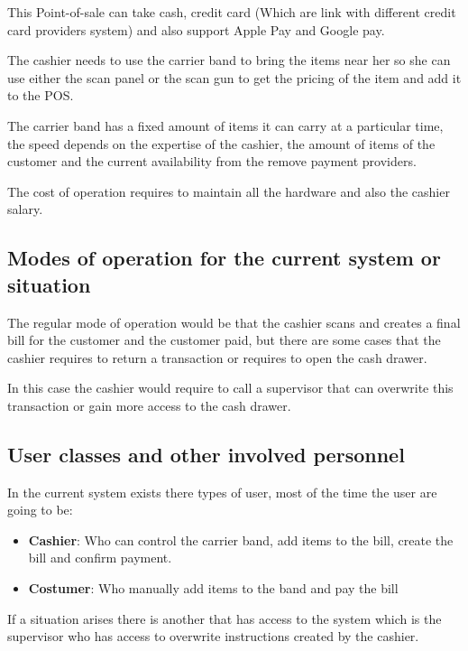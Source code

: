 \documentclass[12pt]{article}
\begin{document}
This Point-of-sale can take cash, credit card (Which are link with different 
credit card providers system) and also support Apple Pay and Google pay.\newline

The cashier needs to use the carrier band to bring the items near her so she 
can use either the scan panel or the scan gun to get the pricing of the item 
and add it to the POS.\newline

The carrier band has a fixed amount of items it can carry at a particular time, 
the speed depends on the expertise of the cashier, the amount of items of the 
customer and the current availability from the remove payment providers.\newline

The cost of operation requires to maintain all the hardware and also the 
cashier salary.

\subsection{Modes of operation for the current system or situation}
The regular mode of operation would be that the cashier scans and creates a 
final bill for the customer and the customer paid, but there are some cases that 
the cashier requires to return a transaction or requires to open the cash drawer.\newline

In this case the cashier would require to call a supervisor that can overwrite 
this transaction or gain more access to the cash drawer.\newline

\subsection{User classes and other involved personnel}
In the current system exists there types of user, most of the time the user 
are going to be:

\begin{itemize}
	\item \textbf{Cashier}: Who can control the carrier band, add items to the 
    bill, create the bill and confirm payment.
	\item \textbf{Costumer}: Who manually add items to the band and pay the bill
\end{itemize}

If a situation arises there is another that has access to the system which is 
the supervisor who has access to overwrite instructions created by the cashier.
\end{document}
